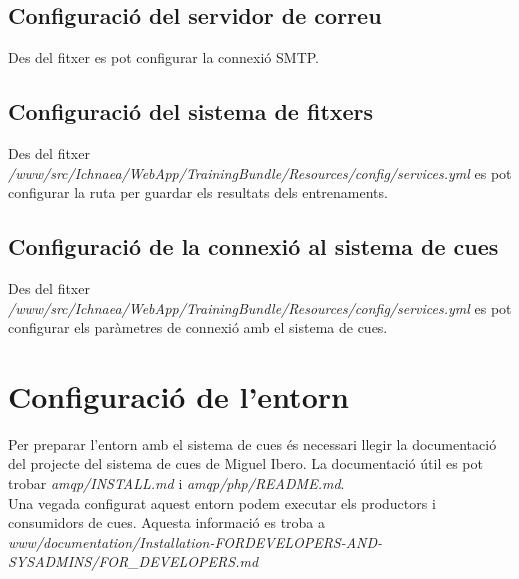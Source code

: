 \subsection{Configuració del servidor de correu}
Des del fitxer  es pot configurar la connexió SMTP.

\subsection{Configuració del sistema de fitxers}
Des del fitxer \textit{/www/src/Ichnaea/WebApp/TrainingBundle/Resources/config/services.yml} es pot configurar la ruta per guardar els resultats dels entrenaments.

\subsection{Configuració de la connexió al sistema de cues}
Des del fitxer \textit{/www/src/Ichnaea/WebApp/TrainingBundle/Resources/config/services.yml} es pot configurar els paràmetres de connexió amb el sistema de cues.

\section{Configuració de l'entorn}
Per preparar l'entorn amb el sistema de cues \'{e}s necessari llegir la documentació del projecte del sistema de cues de Miguel Ibero. La documentació útil es pot trobar \textit{amqp/INSTALL.md} i \textit{amqp/php/README.md}.\\

Una vegada configurat aquest entorn podem executar els productors i consumidors de cues. Aquesta informació es troba a \textit{www/documentation/Installation-FORDEVELOPERS-AND-SYSADMINS/FOR\_DEVELOPERS.md}
